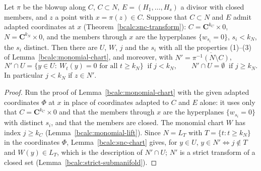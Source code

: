 \begin{lemma}
\label{bcalc:monomial-chart-adapted}
\leanok
Let \(\pi\) be the blowup along \(C\), \(C\subset N\), \(E=(H_1,\dots,H_s)\) a divisor with closed members, and \(z\) a point with \(x=\pi(z)\in C\).
Suppose that \(C\subset N\) and \(E\) admit adapted coordinates at \(x\) (Theorem~\ref{bcalc:snc-transform}): \(C=\mathbf C^{k_C}\times0\),
\(N=\mathbf C^{k_N}\times0\), and the members through \(x\) are the hyperplanes \(\{w_{s_i}=0\}\), \(s_i<k_N\), the \(s_i\) distinct. Then there are
\(U\), \(W\), \(j\) and the \(s_i\) with all the properties (1)--(3) of Lemma~\ref{bcalc:monomial-chart}, and moreover, with
\(N'=\overline{\pi^{-1}(N\setminus C)}\),
\[
 N'\cap U=\{y\in U:\ W_t(y)=0\text{ for all }t\ge k_N\}\ \text{ if }j<k_N,\qquad N'\cap U=\emptyset\ \text{ if }j\ge k_N .
\]
In particular \(j<k_N\) if \(z\in N'\).
\end{lemma}
\begin{proof}
\leanok
Run the proof of Lemma~\ref{bcalc:monomial-chart} with the given adapted coordinates \(\Phi\) at \(x\) in place of coordinates adapted to \(C\) and \(E\)
alone: it uses only that \(C=\mathbf C^{k_C}\times0\) and that the members through \(x\) are the hyperplanes \(\{w_{s_i}=0\}\) with distinct \(s_i\), and
that the members are closed. The monomial chart \(W\) has index \(j\ge k_C\) (Lemma~\ref{bcalc:monomial-lift}). Since \(N=L_T\) with
\(T=\{t:t\ge k_N\}\) in the coordinates \(\Phi\), Lemma~\ref{bcalc:snc-chart} gives, for \(y\in U\), \(y\in N'\iff j\notin T\) and \(W(y)\in L_T\), which
is the description of \(N'\cap U\); \(N'\) is a strict transform of a closed set (Lemma~\ref{bcalc:strict-submanifold}).
\end{proof}

